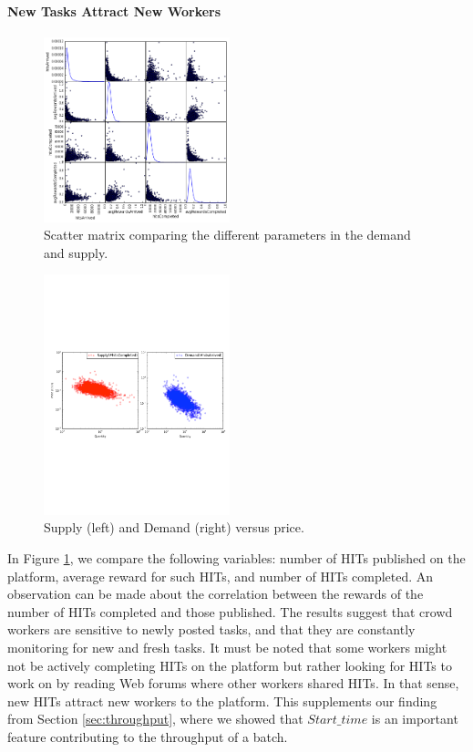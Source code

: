 \paragraph{New Tasks Attract New Workers}
\begin{figure}[tb]
	\centering
		\includegraphics[width=0.48\textwidth]{figures/scattermatrix}
	\caption{Scatter matrix comparing the different parameters in the demand and supply.}
	\label{fig:scatter_matrix}
\end{figure}
\begin{figure}[tb]
	\centering
		\includegraphics[width=0.48\textwidth]{figures/supply_demand}
	\caption{Supply (left) and Demand (right) versus price.}
	\label{fig:dsup}
\end{figure}
In Figure \ref{fig:scatter_matrix}, we compare the following variables: number of HITs published on the platform, average reward for such HITs, and number of HITs completed. An observation can be made about the correlation between the rewards of the number of HITs completed and those published. The results suggest that crowd workers are sensitive to newly posted tasks, and that they are constantly monitoring for new and fresh tasks. It must be noted that some workers might not be actively completing HITs on the platform but rather looking for HITs to work on by reading Web forums where other workers shared HITs. In that sense, new HITs attract new workers to the platform. This supplements our finding from Section \ref{sec:throughput}, where we showed that $Start\_time$ is an important feature contributing to the throughput of a batch.  

